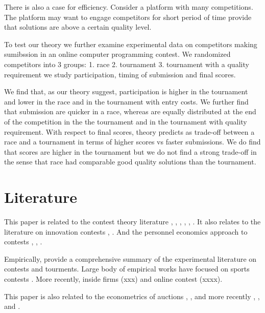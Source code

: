 \documentclass[12pt,]{article}
\begin{document}
There is also a case for efficiency. Consider a platform with many
competitions. The platform may want to engage competitors for short
period of time provide that solutions are above a certain quality level.

To test our theory we further examine experimental data on competitors
making sumibssion in an online computer programming contest. We
randomized competitors into 3 groups: 1. race 2. tournament 3.
tournament with a quality requirement we study participation, timing of
submission and final scores.

We find that, as our theory suggest, participation is higher in the
tournament and lower in the race and in the tournament with entry costs.
We further find that submission are quicker in a race, whereas are
equally distributed at the end of the competition in the the tournament
and in the tournament with quality requirement. With respect to final
scores, theory predicts as trade-off between a race and a tournament in
terms of higher scores vs faster submissions. We do find that scores are
higher in the tournament but we do not find a strong trade-off in the
sense that race had comparable good quality solutions than the
tournament.

\section{Literature}\label{literature}

This paper is related to the contest theory literature
\citet{dixit1987strategic} \citet{baye2003strategic},
\citet{parreiras2010contests}, \citet{moldovanu2001optimal},
\citet{moldovanu2006contest}, \citet{siegel2009all},
\citet{siegel2014contests}. It also relates to the literature on
innovation contests \citet{taylor1995digging}, \citet{che2003optimal}.
And the personnel economics approach to contests \citet{lazear1981rank},
\citet{green1983comparison}, \citet{mary1984economic}.

Empirically, \citet{dechenaux2014survey} provide a comprehensive summary
of the experimental literature on contests and tourments. Large body of
empirical works have focused on sports contests
\citet{szymanski2003economic}. More recently, inside firms (xxx) and
online contest (xxxx).

This paper is also related to the econometrics of auctions
\citet{paarsch1992deciding}, \citet{laffont1995econometrics},
\citet{donald1996identification} and more recently
\citet{athey2011comparing}, \citet{athey2002identification}, and
\citet{athey2007nonparametric}.
\end{document}
